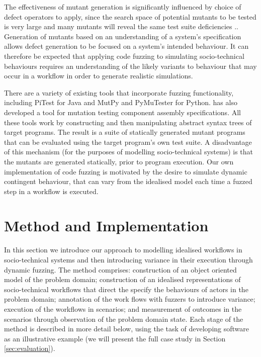 \documentclass{sig-alternate}
\begin{document}
The effectiveness of mutant generation is significantly influenced by choice of
defect operators to apply, since the search space of potential mutants to be
tested is very large and many mutants will reveal the same test suite
deficiencies \citep{takanen08fuzzing}..  Generation of mutants based on an
understanding of a system's specification allows defect generation to be focused
on a system's intended behaviour.  It can therefore be expected that applying
code fuzzing to simulating socio-technical behaviours requires an understanding
of the likely variants to behaviour that may occur in a workflow in order to
generate realistic simulations.

There are a variety of existing tools that incorporate fuzzing functionality,
including PiTest \citep{coles14pitest} for Java and MutPy \citep{mutpy26} and
PyMuTester \citep{pymuttester} for Python.  \citet{storer15ringneck-repos} has
also developed a tool for mutation testing component assembly
specifications. All these tools work by constructing and then manipulating
abstract syntax trees of target programs.  The result is a suite of statically
generated mutant programs that can be evaluated using the target program's own
test suite.  A disadvantage of this mechanism (for the purposes of modelling
socio-technical systems) is that the mutants are generated statically, prior to
program execution.  Our own implementation of code fuzzing is motivated by the
desire to simulate dynamic contingent behaviour, that can vary from the
idealised model each time a fuzzed step in a workflow is executed.



\section{Method and Implementation}
\label{sec:fuzzi-moss}


In this section we introduce our approach to modelling idealised workflows in
socio-technical systems and then introducing variance in their execution through
dynamic fuzzing. The method comprises: construction of an object oriented model
of the problem domain; construction of an idealised representations of
socio-technical workflows that direct the specify the behaviours of actors in
the problem domain; annotation of the work flows with fuzzers to introduce
variance; execution of the workflows in scenarios; and measurement of outcomes
in the scenarios through observation of the problem domain state. Each stage of
the method is described in more detail below, using the task of developing
software as an illustrative example (we will present the full case study in
Section \ref{sec:evaluation}).
\end{document}
